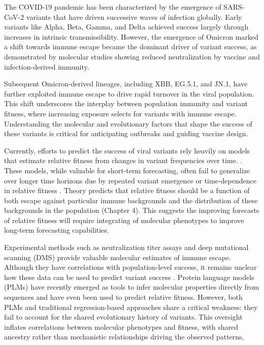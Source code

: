 The COVID-19 pandemic has been characterized by the emergence of SARS-CoV-2 variants that have driven successive waves of infection globally. %
Early variants like Alpha, Beta, Gamma, and Delta achieved success largely through increases in intrinsic transmissibility.
However, the emergence of Omicron marked a shift towards immune escape became the dominant driver of variant success, as demonstrated by molecular studies showing reduced neutralization by vaccine and infection-derived immunity.

Subsequent Omicron-derived lineages, including XBB, EG.5.1, and JN.1, have further exploited immune escape to drive rapid turnover in the viral population.
This shift underscores the interplay between population immunity and variant fitness, where increasing exposure selects for variants with immune escape.
Understanding the molecular and evolutionary factors that shape the success of these variants is critical for anticipating outbreaks and guiding vaccine design.

Currently, efforts to predict the success of viral variants rely heavily on models that estimate relative fitness from changes in variant frequencies over time. \cite{Piantham2022, Figgins2021}.
These models, while valuable for short-term forecasting, often fail to generalize over longer time horizons due by repeated variant emergence or time-dependence in relative fitness \cite{abousamra2024fitness}.  
Theory predicts that relative fitness should be a function of both escape against particular immune backgrounds and the distribution of these backgrounds in the population (Chapter 4).
This suggests the improving forecasts of relative fitness will require integrating of molecular phenotypes to improve long-term forecasting capabilities.

Experimental methods such as neutralization titer assays and deep mutational scanning (DMS) provide valuable molecular estimates of immune escape.
Although they have correlations with population-level success, it remains unclear how these data can be used to predict variant success  \cite{Dadonaite2023}. %
Protein language models (PLMs) have recently emerged as tools to infer molecular properties directly from sequences and have even been used to predict relative fitness. %
However, both PLMs and traditional regression-based approaches share a critical weakness: they fail to account for the shared evolutionary history of variants. 
This oversight inflates correlations between molecular phenotypes and fitness, with shared ancestry rather than mechanistic relationships driving the observed patterns,

